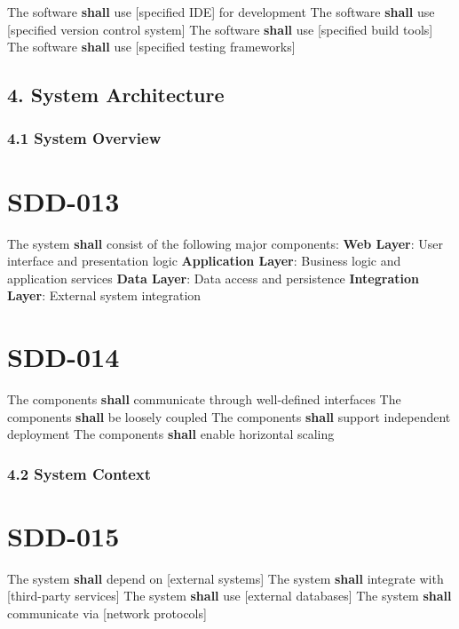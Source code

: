 The software \textbf{shall} use [specified IDE] for development
The software \textbf{shall} use [specified version control system]
The software \textbf{shall} use [specified build tools]
The software \textbf{shall} use [specified testing frameworks]

\subsection{4. System Architecture}

\subsubsection{4.1 System Overview}

\section{SDD-013}\label{SDD-013}

The system \textbf{shall} consist of the following major components:
\textbf{Web Layer}: User interface and presentation logic
\textbf{Application Layer}: Business logic and application services
\textbf{Data Layer}: Data access and persistence
\textbf{Integration Layer}: External system integration

\section{SDD-014}\label{SDD-014}

The components \textbf{shall} communicate through well-defined interfaces
The components \textbf{shall} be loosely coupled
The components \textbf{shall} support independent deployment
The components \textbf{shall} enable horizontal scaling

\subsubsection{4.2 System Context}

\section{SDD-015}\label{SDD-015}

The system \textbf{shall} depend on [external systems]
The system \textbf{shall} integrate with [third-party services]
The system \textbf{shall} use [external databases]
The system \textbf{shall} communicate via [network protocols]

